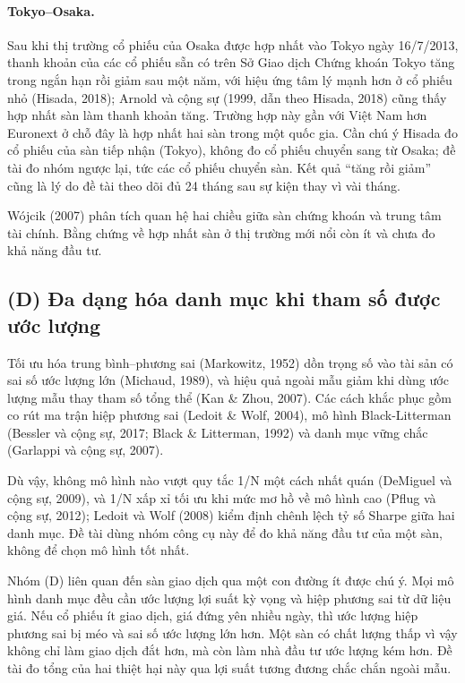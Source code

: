 \paragraph{Tokyo--Osaka.} Sau khi thị trường cổ phiếu của Osaka được hợp nhất vào Tokyo ngày 16/7/2013, thanh khoản của các cổ phiếu sẵn có trên Sở Giao dịch Chứng khoán Tokyo tăng trong ngắn hạn rồi giảm sau một năm, với hiệu ứng tâm lý mạnh hơn ở cổ phiếu nhỏ (Hisada, 2018); Arnold và cộng sự (1999, dẫn theo Hisada, 2018) cũng thấy hợp nhất sàn làm thanh khoản tăng. Trường hợp này gần với Việt Nam hơn Euronext ở chỗ đây là hợp nhất hai sàn trong một quốc gia. Cần chú ý Hisada đo cổ phiếu của sàn tiếp nhận (Tokyo), không đo cổ phiếu chuyển sang từ Osaka; đề tài đo nhóm ngược lại, tức các cổ phiếu chuyển sàn. Kết quả \enquote{tăng rồi giảm} cũng là lý do đề tài theo dõi đủ 24 tháng sau sự kiện thay vì vài tháng.

Wójcik (2007) phân tích quan hệ hai chiều giữa sàn chứng khoán và trung tâm tài chính. Bằng chứng về hợp nhất sàn ở thị trường mới nổi còn ít và chưa đo khả năng đầu tư.

\subsection*{(D) Đa dạng hóa danh mục khi tham số được ước lượng}

Tối ưu hóa trung bình--phương sai (Markowitz, 1952) dồn trọng số vào tài sản có sai số ước lượng lớn (Michaud, 1989), và hiệu quả ngoài mẫu giảm khi dùng ước lượng mẫu thay tham số tổng thể (Kan \& Zhou, 2007). Các cách khắc phục gồm co rút ma trận hiệp phương sai (Ledoit \& Wolf, 2004), mô hình Black-Litterman (Bessler và cộng sự, 2017; Black \& Litterman, 1992) và danh mục vững chắc (Garlappi và cộng sự, 2007).

Dù vậy, không mô hình nào vượt quy tắc 1/N một cách nhất quán (DeMiguel và cộng sự, 2009), và 1/N xấp xỉ tối ưu khi mức mơ hồ về mô hình cao (Pflug và cộng sự, 2012); Ledoit và Wolf (2008) kiểm định chênh lệch tỷ số Sharpe giữa hai danh mục. Đề tài dùng nhóm công cụ này để đo khả năng đầu tư của một sàn, không để chọn mô hình tốt nhất.

Nhóm (D) liên quan đến sàn giao dịch qua một con đường ít được chú ý. Mọi mô hình danh mục đều cần ước lượng lợi suất kỳ vọng và hiệp phương sai từ dữ liệu giá. Nếu cổ phiếu ít giao dịch, giá đứng yên nhiều ngày, thì ước lượng hiệp phương sai bị méo và sai số ước lượng lớn hơn. Một sàn có chất lượng thấp vì vậy không chỉ làm giao dịch đắt hơn, mà còn làm nhà đầu tư ước lượng kém hơn. Đề tài đo tổng của hai thiệt hại này qua lợi suất tương đương chắc chắn ngoài mẫu.

